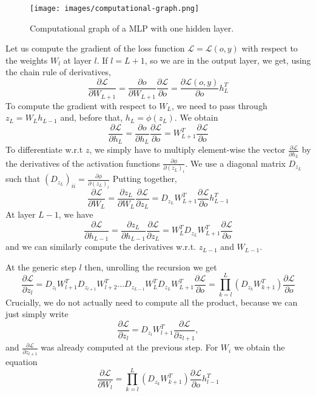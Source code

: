 \documentclass[oneside]{book}
\theoremstyle{definition}
\theoremstyle{plain}
\begin{document}
\begin{figure}
        \centering
        \texttt{[image: images/computational-graph.png]}
        \caption{Computational graph of a MLP with one hidden layer.}
        \label{fig:comp-graph}
\end{figure}
Let us compute the gradient of the loss function $\mathcal L =\mathcal{L}(o, y)$ with respect to the weights $W_{l}$ at layer $l$. 
If  $l=L+1$, so we are in the output layer, we get, using the chain rule of derivatives, 
\[
    \frac{\partial \mathcal{L}}{\partial W_{L+1}} =
    \frac{\partial o}{\partial W_{L+1}} \frac{\partial \mathcal{L}}{\partial o} = 
    \frac{\partial \mathcal{L}(o,y)}{\partial o} h^T_{L}
\]
To compute the gradient with respect to $W_L$, we need to pass through $z_L = W_L h_{L-1}$ and, before that,  $h_L=\phi(z_L)$.  We obtain 
\[
    \frac{\partial\mathcal{L}}{\partial h_L} = \frac{\partial o}{\partial h_L} \frac{\partial\mathcal{L} }{\partial o} = W^T_{L+1} \frac{\partial\mathcal{L}}{\partial o}
\]
To differentiate w.r.t $z$, we simply have to multiply element-wise the vector $\frac{\partial\mathcal{L}}{\partial h_L}$ by the derivatives of the activation functions $\frac{\partial \phi}{\partial (z_L)_i}$.  We use a diagonal matrix $D_{z_L}$ such that $(D_{z_L})_{ii} = \frac{\partial \phi}{\partial (z_L)_i}$  
Putting together, 
\[
    \frac{\partial \mathcal{L}}{\partial W_L} = \frac{\partial z_L}{\partial W_L} \frac{\partial\mathcal{L}}{\partial z_L} = D_{z_L} W^T_{L+1} \frac{\partial \mathcal{L}}{\partial o} h^T_{L-1} 
\] 
At layer $L-1$, we have
\[
    \frac{\partial\mathcal{L}}{\partial h_{L-1}} = \frac{\partial z_L}{\partial h_{L-1}} \frac{\partial\mathcal{L} }{\partial z_{L}} = W_L^T D_{z_L} W^T_{L+1} \frac{\partial\mathcal{L}}{\partial o}
\]
and we can similarly compute the derivatives w.r.t. $z_{L-1}$ and $W_{L-1}$. 

At the generic step $l$ then, unrolling the recursion we get
\begin{equation}\label{eqn:backprop}
      \frac{\partial\mathcal{L}}{\partial z_l} = 
      D_{z_l} W^T_{l+1}  D_{z_{l+1}} W^T_{l+2} ...  D_{z_{L-1}} W^T_{L}  D_{z_L} W^T_{L+1} \frac{\partial\mathcal{L}}{\partial o} =\prod_{k=l}^{L} \left( D_{z_k} W^T_{k+1}\right) \frac{\partial\mathcal{L}}{\partial o}
\end{equation}
Crucially, we do not actually need to compute all the product, because we can just simply write
\[
 \frac{\partial\mathcal{L}}{\partial z_l} = D_{z_l} W_{l+1}^T \frac{\partial\mathcal{L}}{\partial z_{l+1}},  
\]  and $\frac{\partial\mathcal{L}}{\partial z_{l+1}}$ was already computed at the previous step.  
For $W_i$ we obtain the equation
\begin{equation}\label{eqn:backprop_W}
    \frac{\partial \mathcal{L}}{\partial W_l} =\prod_{k=l}^{L} \left( D_{z_k} W^T_{k+1}\right) \frac{\partial\mathcal{L}}{\partial o} h^T_{l-1}
\end{equation}
\end{document}
